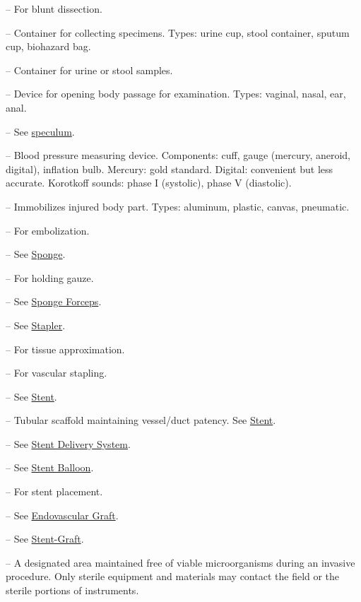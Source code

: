 -- For blunt dissection.

-- Container for collecting specimens. Types: urine cup, stool container, sputum cup, biohazard bag.

-- Container for urine or stool samples.

-- Device for opening body passage for examination. Types: vaginal, nasal, ear, anal.

-- See \hyperlink{Speculum}{speculum}.

-- Blood pressure measuring device. Components: cuff, gauge (mercury, aneroid, digital), inflation bulb. Mercury: gold standard. Digital: convenient but less accurate. Korotkoff sounds: phase I (systolic), phase V (diastolic).

-- Immobilizes injured body part. Types: aluminum, plastic, canvas, pneumatic.

-- For embolization.

-- See \hyperlink{Sponge}{Sponge}.

-- For holding gauze.

-- See \hyperlink{Sponge Forceps}{Sponge Forceps}.

-- See \hyperlink{Stapler}{Stapler}.

-- For tissue approximation.

-- For vascular stapling.

-- See \hyperlink{Stent}{Stent}.

-- Tubular scaffold maintaining vessel/duct patency. See \hyperlink{Stent}{Stent}.

-- See \hyperlink{Stent Delivery System}{Stent Delivery System}.

-- See \hyperlink{Stent Balloon}{Stent Balloon}.

-- For stent placement.

-- See \hyperlink{Endovascular Graft}{Endovascular Graft}.

-- See \hyperlink{Stent-Graft}{Stent-Graft}.

-- A designated area maintained free of viable microorganisms during an invasive procedure. Only sterile equipment and materials may contact the field or the sterile portions of instruments.

